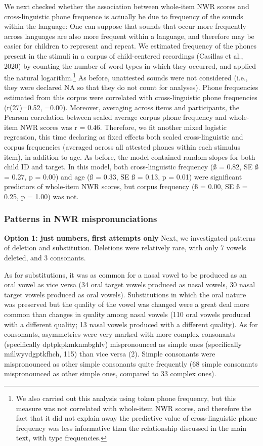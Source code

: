 \documentclass[english,,man,floatsintext]{apa6}
\begin{document}
We next checked whether the association between whole-item NWR scores
and cross-linguistic phone frequence is actually be due to frequency of
the sounds within the language: One can suppose that sounds that occur
more frequently across languages are also more frequent within a
language, and therefore may be easier for children to represent and
repeat. We estimated frequency of the phones present in the stimuli in a
corpus of child-centered recordings (Casillas et al., 2020) by counting
the number of word types in which they occurred, and applied the natural
logarithm.\footnote{We also carried out this analysis using token phone
  frequency, but this measure was not correlated with whole-item NWR
  scores, and therefore the fact that it did not explain away the
  predictive value of cross-linguistic phone frequency was less
  informative than the relationship discussed in the main text, with
  type frequencies.} As before, unattested sounds were not considered
(i.e., they were declared NA so that they do not count for analyses).
Phone frequencies estimated from this corpus were correlated with
cross-linguistic phone frequencies (r(27)=0.52, =0.00). Moreover,
averaging across items and participants, the Pearson correlation between
scaled average corpus phone frequency and whole-item NWR scores was r =
0.46. Therefore, we fit another mixed logistic regression, this time
declaring as fixed effects both scaled cross-linguistic and corpus
frequencies (averaged across all attested phones within each stimulus
item), in addition to age. As before, the model contained random slopes
for both child ID and target. In this model, both cross-linguistic
frequency (ß = 0.82, SE ß = 0.27, p = 0.00) and age (ß = 0.33, SE ß =
0.13, p = 0.01) were significant predictors of whole-item NWR scores,
but corpus frequency (ß = 0.00, SE ß = 0.25, p = 1.00) was not.

\subsubsection{Patterns in NWR
mispronunciations}\label{patterns-in-nwr-mispronunciations}

\textbf{Option 1: just numbers, first attempts only } Next, we
investigated patterns of deletion and substitution. Deletions were
relatively rare, with only 7 vowels deleted, and 3 consonants.

As for substitutions, it was as common for a nasal vowel to be produced
as an oral vowel as vice versa (34 oral target vowels produced as nasal
vowels, 30 nasal target vowels produced as oral vowels). Substitutions
in which the oral nature was preserved but the quality of the vowel was
changed were a great deal more common than changes in quality among
nasal vowels (110 oral vowels produced with a different quality; 13
nasal vowels produced with a different quality). As for consonants,
asymmetries were very marked with more complex consonants (specifically
dptpkpkmknmbghlv) mispronounced as simple ones (specifically
mńlwyvdgptkfhch, 115) than vice versa (2). Simple consonants were
mispronounced as other simple consonants quite frequently (68 simple
consonants mispronounced as other simple ones, compared to 33 complex
ones).
\end{document}
